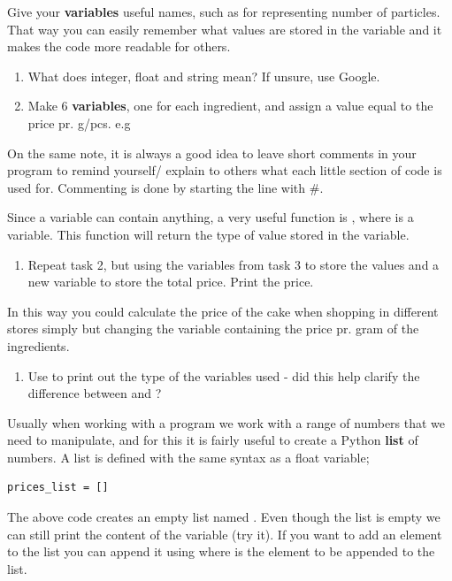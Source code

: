 \documentclass{article}
\begin{document}
Give your {\bf variables} useful names, such as  for representing number of particles.
That way you can easily remember what values are stored in the variable and it makes the code more readable for others.

\begin{enumerate}[resume]
    \item What does integer, float and string mean? If unsure, use Google.
    \item Make 6 {\bf variables}, one for each ingredient, and assign a value equal to the price pr. g/pcs. e.g 
\end{enumerate}

On the same note, it is always a good idea to leave short comments in your program to remind yourself/ explain to others what each little section of code is used for.
Commenting is done by starting the line with \#.

Since a variable can contain anything, a very useful function is , where  is a variable.
This function will return the type of value stored in the variable.

\begin{enumerate}[resume]
    \item Repeat task 2, but using the variables from task 3 to store the values and a new variable to store the total price. Print the price.
\end{enumerate}

In this way you could calculate the price of the cake when shopping in different stores simply but changing the variable containing the price pr. gram of the ingredients. 

\begin{enumerate}[resume]
    \item Use  to print out the type of the variables used - did this help clarify the difference between  and ?
\end{enumerate}

Usually when working with a program we work with a range of numbers that we need to manipulate, and for this it is fairly useful to create a Python {\bf list} of numbers.
A list is defined with the same syntax as a float variable;

\begin{lstlisting}
prices_list = []
\end{lstlisting}

The above code creates an empty list named .
Even though the list is empty we can still print the content of the variable (try it).
If you want to add an element to the list you can append it using  where  is the element to be appended to the list.
\end{document}
